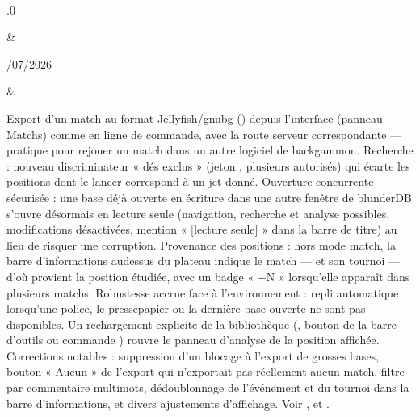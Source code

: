 \documentclass[letterpaper,10pt,french]{sphinxmanual}
\begin{document}
\begin{savenotes}
\begin{longtable}{}
\begin{varwidth}[t]{}
\sphinxbeforeendvarwidth
\end{varwidth}%
\\
\sphinxhline\begin{varwidth}[t]{}
.0
\sphinxbeforeendvarwidth
\end{varwidth}%
&\begin{varwidth}[t]{}
/07/2026
\sphinxbeforeendvarwidth
\end{varwidth}%
&\begin{varwidth}[t]{}
\sphinxAtStartPar
Export d’un match au format Jellyfish/gnubg () depuis l’interface (panneau Matchs) comme en ligne de commande, avec la route serveur correspondante — pratique pour rejouer un match dans un autre logiciel de backgammon. Recherche : nouveau discriminateur « dés exclus » (jeton , plusieurs autorisés) qui écarte les positions dont le lancer correspond à un jet donné. Ouverture concurrente sécurisée : une base déjà ouverte en écriture dans une autre fenêtre de blunderDB s’ouvre désormais en lecture seule (navigation, recherche et analyse possibles, modifications désactivées, mention « {[}lecture seule{]} » dans la barre de titre) au lieu de risquer une corruption. Provenance des positions : hors mode match, la barre d’informations au\sphinxhyphen{}dessus du plateau indique le match — et son tournoi — d’où provient la position étudiée, avec un badge « +N » lorsqu’elle apparaît dans plusieurs matchs. Robustesse accrue face à l’environnement : repli automatique lorsqu’une police, le presse\sphinxhyphen{}papier ou la dernière base ouverte ne sont pas disponibles. Un rechargement explicite de la bibliothèque (, bouton de la barre d’outils ou commande ) rouvre le panneau d’analyse de la position affichée. Corrections notables : suppression d’un blocage à l’export de grosses bases, bouton « Aucun » de l’export qui n’exportait pas réellement aucun match, filtre par commentaire multi\sphinxhyphen{}mots, dédoublonnage de l’événement et du tournoi dans la barre d’informations, et divers ajustements d’affichage. Voir {\hyperref[\detokenize{cmd_mode:cmd-mode}]{}}, {\hyperref[\detokenize{manuel:panneau-matchs}]{}} et {\hyperref[\detokenize{manuel:manuel}]{}}.

\end{varwidth}
\end{longtable}
\end{savenotes}
\end{document}
